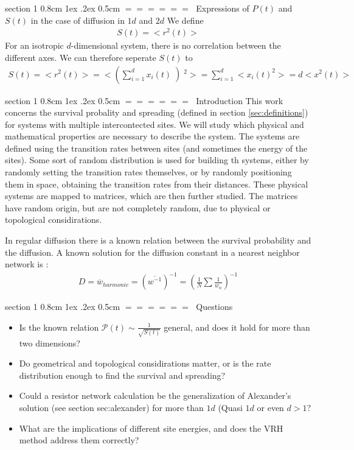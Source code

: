 \documentclass[onecolumn,fleqn,notitlepage,secnumarabic]{revtex4}
\makeatletter
\newcommand{\beq}{\begin{eqnarray}}
\newcommand{\eeq}{\end{eqnarray}}
\def\section{%
  \@startsection
    {section}%
    {1}%
    {\z@}%
    {0.8cm \@plus1ex \@minus .2ex}%
    {0.5cm}%
    {\Large\bf $=\!=\!=\!=\!=\!=\;$}%
}%
\makeatother
\begin{document}
\section{Expressions of $P(t)$ and $S(t)$ in the case of diffusion in $1d$ and $2d$}
We define 
\beq
  S(t) = <r^2(t)>
\eeq
For an isotropic $d$-dimensional system, there is no correlation between the different axes. We can therefore seperate $S(t)$ to 
\beq 
  S(t) =<r^2(t)> = < \left(\sum_{i=1}^d x_i(t) \left)^2 > = \sum_{i=1}^d <x_i(t)^2> = d<x^2(t)>
\eeq



\section{Introduction}
This work concerns the survival probality and spreading (defined in section \ref{sec:definitions}) for systems with multiple intercontected sites. We will study which physical and mathematical properties are necessary to describe the system. The systems are defined using the transition rates between sites (and sometimes the energy of the sites). Some sort of random distribution is used for building th systems, either by randomly setting the transition rates themselves, or by randomly positioning them in space, obtaining the transition rates from their distances. These physical systems are mapped to matrices, which are then further studied. The matrices have random origin, but are not completely random, due to physical or topological considirations.


In regular diffusion there is a known relation between the survival probability and the diffusion. 
A known solution for the diffusion constant in a nearest neighbor network is \cite{Derrida:1983}:
\begin{align}
D=\overline{w}_{harmonic} =(\overline{w^{-1}})^{-1}=\left(\frac{1}{N}\sum\frac{1}{w_n}\right)^{-1}
\end{align}

\section{Questions}
\begin{itemize}
    \item Is the known relation $\mathcal{P}(t) \sim \frac{1}{\sqrt{S(t)}}$ general, and does it hold for more than two dimensions?
    \item Do geometrical and topological considirations matter, or is the rate distribution enough to find the survival and spreading?
    \item Could a resistor network calculation be the generalization of Alexander's solution (see section {sec:alexander}) for more than $1d$ (Quasi $1d$ or even $d>1$?
    \item What are the implications of different site energies, and does the VRH method address them correctly?
\end{itemize}
\end{document}
